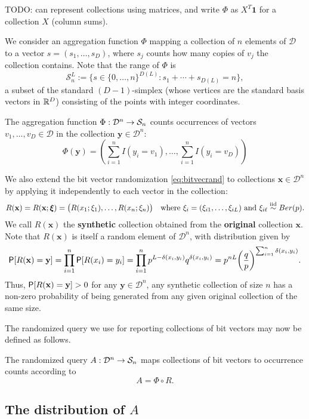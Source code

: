 \documentclass[11pt,draft]{article}
\newcommand{\Dsp}{\mathcal{D}}
\newcommand{\Ssp}{\mathcal{S}}
\newcommand{\xv}{\mathbf{x}}
\newcommand{\yv}{\mathbf{y}}
\begin{document}
TODO: can represent collections using matrices, and write $\Phi$ as 
$X^T\mathbf{1}$ for a collection $X$ (column sums).

We consider an aggregation function $\Phi$ mapping a collection of $n$ elements
of $\Dsp$ to a vector $s = (s_1,\dots,s_D)$, where $s_j$ counts how many copies
of $v_j$ the collection contains.
Note that the range of $\Phi$ is
\[ \Ssp_n^L := \big\{ s \in \{0,\dots,n\}^{D(L)}:
s_1 +\cdots + s_{D(L)} = n\big\}, \]
a subset of the standard $(D - 1)$-simplex (whose vertices are the standard
basis vectors in $\mathbb{R}^D$) consisting of the points with integer coordinates.

\begin{defn}
The aggregation function $\map{\Phi}{\Dsp^n}{\Ssp_n}$ counts occurrences of
vectors $v_1,\dots, v_D \in \Dsp$ in the collection $\yv \in \Dsp^n$:
\[ \Phi(\yv) = \left(\sum_{i = 1}^n I(y_i = v_1),\dots,
\sum_{i = 1}^n I(y_i = v_D) \right)
\]
\end{defn}

We also extend the bit vector randomization \eqref{eq:bitvecrand} to
collections $\xv\in\Dsp^n$ by applying it independently to each vector in the
collection:
\[ R(\xv) = R(\xv;\boldsymbol{\xi})
= \big(R(x_1;\xi_1),\dots,R(x_n; \xi_n)\big)
\quad\text{where } \xi_i = (\xi_{i1},\dots,\xi_{iL}) \text{ and }
\xi_{i\ell} \iid Ber(p). \]
We call $R(\xv)$ the \textbf{synthetic} collection obtained from the
\textbf{original} collection $\xv$.
Note that $R(\xv)$ is itself a random element of $\Dsp^n$, with distribution
given by
\[ \P[R(\xv) = \yv] = \prod_{i=1}^n \P[R(x_i) = y_i] =
\prod_{i=1}^n p^{L-\delta(x_i,y_i)}q^{\delta(x_i,y_i)} =
p^{nL} \bigg(\frac{q}{p}\bigg)^{\sum_{i=1}^n \delta(x_i, y_i)}.
\]
Thus, $\P[R(\xv) = \yv] > 0$ for any $\yv\in\Dsp^n$, \ie any synthetic
collection of size $n$ has a non-zero probability of being generated from any
given original collection of the same size.

The randomized query we use for reporting collections of bit vectors may now
be defined as follows.

\begin{defn}
The randomized query $\map{A}{\Dsp^n}{\Ssp_n}$ maps collections of bit vectors
to occurrence counts according to
\[ A = \Phi \circ R. \]
\end{defn}

\subsection{The distribution of $A$}
\end{document}
